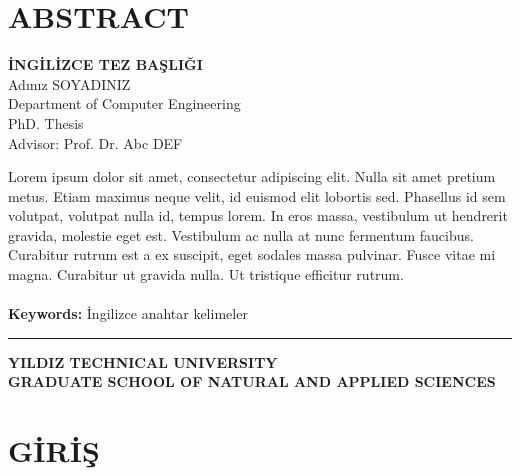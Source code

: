 \documentclass[a4paper,12pt]{report}
\begin{document}
\chapter*{ABSTRACT}
\vspace{-12pt}
\begin{center}
\large{\bfseries{İNGİLİZCE TEZ BAŞLIĞI}}\\[1cm]

\fontsize{12pt}{12pt}\selectfont
Adınız SOYADINIZ\\[1cm]

Department of Computer Engineering\\[6pt]
PhD. Thesis\\[1cm]

Advisor: Prof. Dr. Abc DEF\\[1cm]
\end{center}

\begin{singlespacing}
Lorem ipsum dolor sit amet, consectetur adipiscing elit. Nulla sit amet pretium metus. Etiam maximus neque velit, id euismod elit lobortis sed. Phasellus id sem volutpat, volutpat nulla id, tempus lorem. In eros massa, vestibulum ut hendrerit gravida, molestie eget est. Vestibulum ac nulla at nunc fermentum faucibus. Curabitur rutrum est a ex suscipit, eget sodales massa pulvinar. Fusce vitae mi magna. Curabitur ut gravida nulla. Ut tristique efficitur rutrum.
\\
\\
\textbf{Keywords:} İngilizce anahtar kelimeler
\end{singlespacing}

\vfill
\hrule
\begin{flushright}
\textbf{YILDIZ TECHNICAL UNIVERSITY \\ GRADUATE SCHOOL OF NATURAL AND APPLIED SCIENCES}
\end{flushright}



\onehalfspacing


\chapter{GİRİŞ} %
\end{document}
